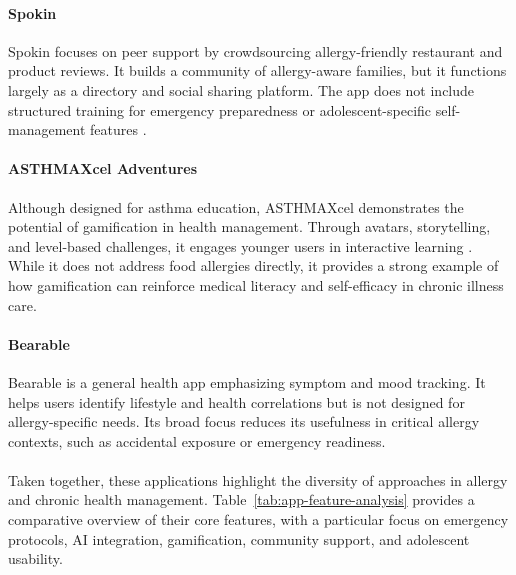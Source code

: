 \documentclass[MScCS]{uccthesis}
\begin{document}
\paragraph{Spokin}  
Spokin focuses on peer support by crowdsourcing allergy-friendly restaurant and product reviews. It builds a community of allergy-aware families, but it functions largely as a directory and social sharing platform. The app does not include structured training for emergency preparedness or adolescent-specific self-management features \parencite{broome2021fasst}.  

\paragraph{ASTHMAXcel Adventures}  
Although designed for asthma education, ASTHMAXcel demonstrates the potential of gamification in health management. Through avatars, storytelling, and level-based challenges, it engages younger users in interactive learning \parencite{tran2022gamification}. While it does not address food allergies directly, it provides a strong example of how gamification can reinforce medical literacy and self-efficacy in chronic illness care.  

\paragraph{Bearable}  
Bearable is a general health app emphasizing symptom and mood tracking. It helps users identify lifestyle and health correlations but is not designed for allergy-specific needs. Its broad focus reduces its usefulness in critical allergy contexts, such as accidental exposure or emergency readiness.  

\paragraph{}Taken together, these applications highlight the diversity of approaches in allergy and chronic health management. Table~\ref{tab:app-feature-analysis} provides a comparative overview of their core features, with a particular focus on emergency protocols, AI integration, gamification, community support, and adolescent usability.

\end{document}
